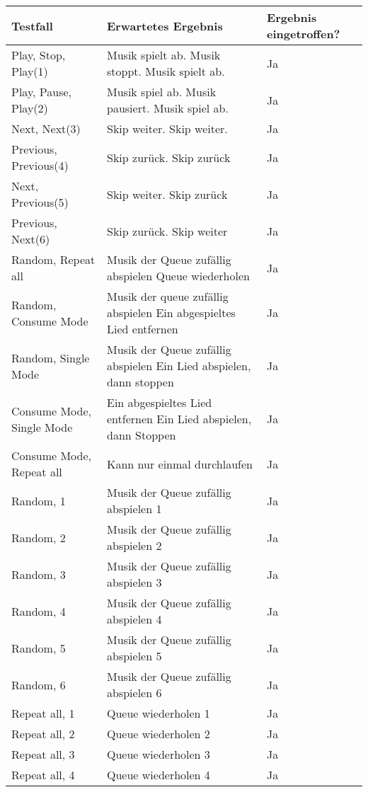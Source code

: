 \begin{tabularx}{\textwidth}{|X|p{7cm}|p{3cm}|}
    \hline
    \textbf{Testfall} & \textbf{Erwartetes Ergebnis} & \textbf{Ergebnis eingetroffen?}\\
    \hline
    Play, Stop, Play(1) & Musik spielt ab. Musik stoppt. Musik spielt ab. & Ja\\
    \hline
    Play, Pause, Play(2) & Musik spiel ab. Musik pausiert. Musik spiel ab. & Ja\\
    \hline
    Next, Next(3) & Skip weiter. Skip weiter. & Ja\\
    \hline
    Previous, Previous(4) & Skip zurück. Skip zurück & Ja\\
    \hline
    Next, Previous(5) & Skip weiter. Skip zurück & Ja\\
    \hline
    Previous, Next(6) & Skip zurück. Skip weiter & Ja\\
    \hline
    Random, Repeat all & Musik der Queue zufällig abspielen Queue wiederholen & Ja\\
    \hline
    Random, Consume Mode & Musik der queue zufällig abspielen Ein abgespieltes Lied entfernen & Ja\\
    \hline
    Random, Single Mode & Musik der Queue zufällig abspielen Ein Lied abspielen, dann stoppen & Ja\\
    \hline
    Consume Mode, Single Mode & Ein abgespieltes Lied entfernen Ein Lied abspielen, dann Stoppen & Ja\\
    \hline
    Consume Mode, Repeat all & Kann nur einmal durchlaufen & Ja\\
    \hline
    Random, 1 & Musik der Queue zufällig abspielen 1 & Ja\\
    \hline
    Random, 2 & Musik der Queue zufällig abspielen 2 & Ja\\
    \hline
    Random, 3 & Musik der Queue zufällig abspielen 3 & Ja\\
    \hline
    Random, 4 & Musik der Queue zufällig abspielen 4 & Ja\\
    \hline
    Random, 5 & Musik der Queue zufällig abspielen 5 & Ja\\
    \hline
    Random, 6 & Musik der Queue zufällig abspielen 6 & Ja\\
    \hline
    Repeat all, 1 & Queue wiederholen 1 & Ja\\
    \hline
    Repeat all, 2 & Queue wiederholen 2 & Ja\\
    \hline
    Repeat all, 3 & Queue wiederholen 3 & Ja\\
    \hline
    Repeat all, 4 & Queue wiederholen 4 & Ja\\
    \hline
\end{tabularx}


